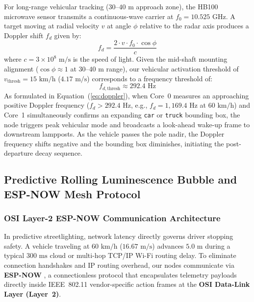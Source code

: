 \documentclass[11pt,a4paper]{article}
\begin{document}
For long-range vehicular tracking (\(30\text{--}40\text{ m}\) approach zone), the HB100 microwave sensor transmits a continuous-wave carrier at \(f_0 = 10.525\text{ GHz}\). A target moving at radial velocity \(v\) at angle \(\phi\) relative to the radar axis produces a Doppler shift \(f_d\) given by:
\begin{equation}
f_d = \frac{2 \cdot v \cdot f_0 \cdot \cos\phi}{c}
\label{eq:doppler}
\end{equation}
where \(c = 3 \times 10^8\text{ m/s}\) is the speed of light. Given the mid-shaft mounting alignment (\(\cos\phi \approx 1\) at \(30\text{--}40\text{ m}\) range), our vehicular activation threshold of \(v_{\text{thresh}} = 15\text{ km/h}\) (\(4.17\text{ m/s}\)) corresponds to a frequency threshold of:
\begin{equation}
f_{d,\text{thresh}} \approx 292.4\text{ Hz}
\label{eq:doppler_thresh}
\end{equation}
As formulated in Equation~(\ref{eq:doppler}), when Core~0 measures an approaching positive Doppler frequency (\(f_d > 292.4\text{ Hz}\), e.g., \(f_d = 1{,}169.4\text{ Hz}\) at \(60\text{ km/h}\)) and Core~1 simultaneously confirms an expanding \texttt{car} or \texttt{truck} bounding box, the node triggers peak vehicular mode and broadcasts a look-ahead wake-up frame to downstream lampposts. As the vehicle passes the pole nadir, the Doppler frequency shifts negative and the bounding box diminishes, initiating the post-departure decay sequence.

\subsection{Predictive Rolling Luminescence Bubble and ESP-NOW Mesh Protocol}

\subsubsection{OSI Layer-2 ESP-NOW Communication Architecture}
In predictive streetlighting, network latency directly governs driver stopping safety. A vehicle traveling at \(60\text{ km/h}\) (\(16.67\text{ m/s}\)) advances \(5.0\text{ m}\) during a typical \(300\text{ ms}\) cloud or multi-hop TCP/IP Wi-Fi routing delay. To eliminate connection handshakes and IP routing overhead, our nodes communicate via \textbf{ESP-NOW} \cite{espressif_espnow}, a connectionless protocol that encapsulates telemetry payloads directly inside IEEE~802.11 vendor-specific action frames at the \textbf{OSI Data-Link Layer (Layer~2)}.
\end{document}

